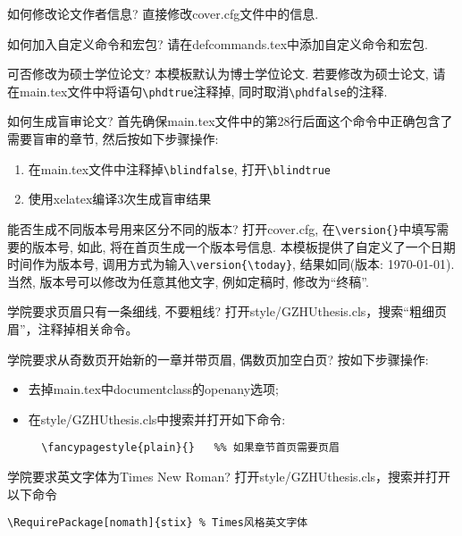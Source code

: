 \begin{QandA}{如何修改论文作者信息?}
直接修改cover.cfg文件中的信息.
\end{QandA}

\begin{QandA}{如何加入自定义命令和宏包?}
请在defcommands.tex中添加自定义命令和宏包.
\end{QandA}

\begin{QandA}{可否修改为硕士学位论文?}
本模板默认为博士学位论文. 若要修改为硕士论文, 请在main.tex文件中将语句\verb|\phdtrue|注释掉, 同时取消\verb|\phdfalse|的注释. 
\end{QandA}

\begin{QandA}{如何生成盲审论文?}
首先确保main.tex文件中的第28行后面这个\verb||命令中正确包含了需要盲审的章节, 然后按如下步骤操作:
\begin{enumerate}
\item 在main.tex文件中注释掉\verb|\blindfalse|, 打开\verb|\blindtrue|
\item 使用xelatex编译3次生成盲审结果
\end{enumerate}
\end{QandA}

\begin{QandA}{能否生成不同版本号用来区分不同的版本?}
打开cover.cfg, 在\verb|\version{}|中填写需要的版本号, 如此, 将在首页生成一个版本号信息. 本模板提供了自定义了一个日期时间作为版本号, 调用方式为输入\verb|\version{\today}|, 结果如同(版本: \today). 当然, 版本号可以修改为任意其他文字, 例如定稿时, 修改为“终稿”.
\end{QandA}

\begin{QandA}{学院要求页眉只有一条细线, 不要粗线?}
打开style/GZHUthesis.cls，搜索“粗细页眉”，注释掉相关命令。
\end{QandA}

\begin{QandA}{学院要求从奇数页开始新的一章并带页眉, 偶数页加空白页?}
按如下步骤操作:
\begin{itemize}
  \item 去掉main.tex中documentclass的openany选项;
  \item 在style/GZHUthesis.cls中搜索并打开如下命令:
  \begin{verbatim}
  \fancypagestyle{plain}{}   %% 如果章节首页需要页眉
  \end{verbatim}
\end{itemize}
\end{QandA}

\begin{QandA}{学院要求英文字体为Times New Roman?}
打开style/GZHUthesis.cls，搜索并打开以下命令
\begin{verbatim}
\RequirePackage[nomath]{stix} % Times风格英文字体
\end{verbatim} 
\end{QandA}